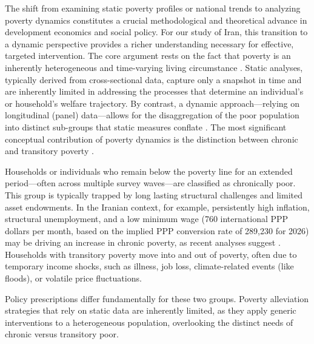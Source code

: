 \documentclass[12pt,a4paper]{article}
\begin{document}
The shift from examining static poverty profiles or national trends to analyzing poverty dynamics constitutes a crucial methodological and theoretical advance in development economics and social policy. For our study of Iran, this transition to a dynamic perspective provides a richer understanding necessary for effective, targeted intervention. The core argument rests on the fact that poverty is an inherently heterogeneous and time-varying living circumstance \citep{BaulchHoddinott2000}. Static analyses, typically derived from cross-sectional data, capture only a snapshot in time and are inherently limited in addressing the processes that determine an individual's or household's welfare trajectory. By contrast, a dynamic approach—relying on longitudinal (panel) data—allows for the disaggregation of the poor population into distinct sub-groups that static measures conflate \citep{BarrettCarter2016}. The most significant conceptual contribution of poverty dynamics is the distinction between chronic and transitory poverty \citep{HulmeShepherd2003}.

 Households or individuals who remain below the poverty line for an extended period—often across multiple survey waves—are classified as chronically poor. This group is typically trapped by long lasting structural challenges and limited asset endowments. In the Iranian context, for example, persistently high inflation, structural unemployment, and a low minimum wage (760 international PPP dollars per month, based on the implied PPP conversion rate of 289,230 for 2026) may be driving an increase in chronic poverty, as recent analyses suggest \citep{EslamiHoseini2024}. Households with transitory poverty move into and out of poverty, often due to temporary income shocks, such as illness, job loss, climate-related events (like floods), or volatile price fluctuations.\par
Policy prescriptions differ fundamentally for these two groups. Poverty alleviation strategies that rely on static data are inherently limited, as they apply generic interventions to a heterogeneous population, overlooking the distinct needs of chronic versus transitory poor.\par
\end{document}
